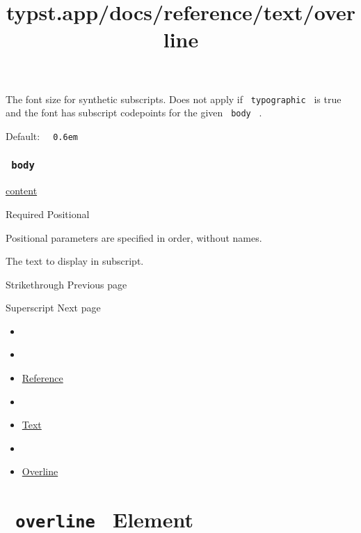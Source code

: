 The font size for synthetic subscripts. Does not apply if
\texttt{\ typographic\ } is true and the font has subscript codepoints
for the given \texttt{\ body\ } .

Default: \texttt{\ }{\texttt{\ 0.6em\ }}\texttt{\ }

\subsubsection{\texorpdfstring{\texttt{\ body\ }}{ body }}\label{parameters-body}

\href{/docs/reference/foundations/content/}{content}

{Required} {{ Positional }}

\label{parameters-body-positional-tooltip}
Positional parameters are specified in order, without names.

The text to display in subscript.

\href{/docs/reference/text/strike/}{\pandocbounded{}}

{ Strikethrough } { Previous page }

\href{/docs/reference/text/super/}{\pandocbounded{}}

{ Superscript } { Next page }


\title{typst.app/docs/reference/text/overline}

\begin{itemize}
\tightlist
\item
  \href{/docs}{}
\item
  
\item
  \href{/docs/reference/}{Reference}
\item
  
\item
  \href{/docs/reference/text/}{Text}
\item
  
\item
  \href{/docs/reference/text/overline/}{Overline}
\end{itemize}

\section{\texorpdfstring{\texttt{\ overline\ } {{ Element
}}}{ overline   Element }}\label{summary}

